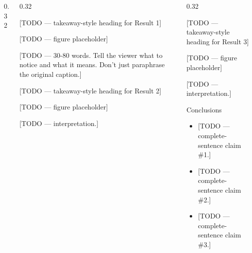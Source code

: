 \begin{frame}[t]{}
\begin{columns}[T]
\begin{column}{0.32\textwidth}
\end{column}

\begin{column}{0.32\textwidth}

\begin{block}{[TODO — takeaway-style heading for Result 1]}
  \begin{center}
    [TODO — figure placeholder]
  \end{center}
  \vspace{0.3em}
  {\small [TODO — 30-80 words. Tell the viewer what to notice and what
  it means. Don't just paraphrase the original caption.]}
\end{block}

\begin{block}{[TODO — takeaway-style heading for Result 2]}
  \begin{center}
    [TODO — figure placeholder]
  \end{center}
  \vspace{0.3em}
  {\small [TODO — interpretation.]}
\end{block}

\end{column}

\begin{column}{0.32\textwidth}

\begin{block}{[TODO — takeaway-style heading for Result 3]}
  \begin{center}
    [TODO — figure placeholder]
  \end{center}
  \vspace{0.3em}
  {\small [TODO — interpretation.]}
\end{block}

\begin{block}{Conclusions}
  \begin{itemize}
    \item {[TODO — complete-sentence claim \#1.]}
    \item {[TODO — complete-sentence claim \#2.]}
    \item {[TODO — complete-sentence claim \#3.]}
  \end{itemize}
\end{block}


\end{column}
\end{columns}
\end{frame}
